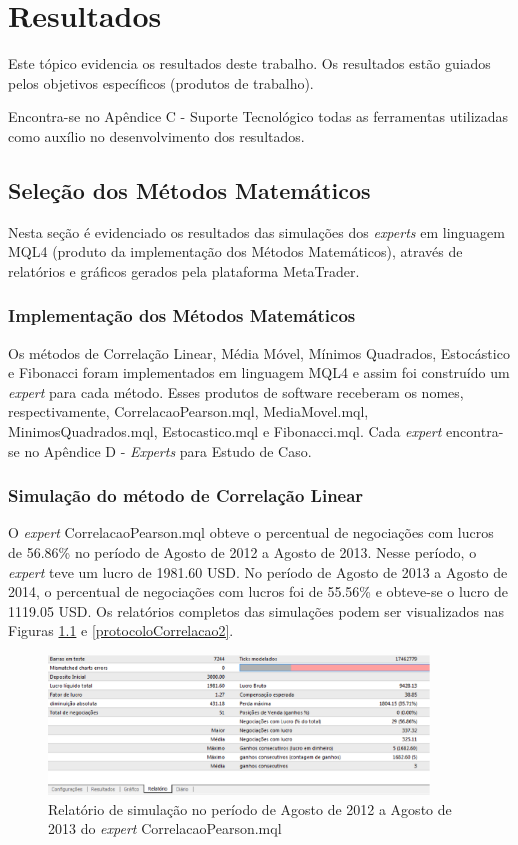 \chapter{Resultados}
Este tópico evidencia os resultados deste trabalho. Os resultados estão guiados pelos objetivos específicos (produtos de trabalho).

Encontra-se no Apêndice C - Suporte Tecnológico todas as ferramentas utilizadas como auxílio no desenvolvimento dos resultados.

\section{Seleção dos Métodos Matemáticos}

Nesta seção é evidenciado os resultados  das simulações dos \textit{experts} em linguagem MQL4 (produto da implementação dos Métodos Matemáticos), através de relatórios e gráficos gerados pela plataforma MetaTrader.

\subsection{Implementação dos Métodos Matemáticos}

Os métodos de Correlação Linear, Média Móvel, Mínimos Quadrados, Estocástico e Fibonacci foram implementados em linguagem MQL4 e assim foi construído um \textit{expert} para cada método. Esses produtos de software receberam os nomes, respectivamente, CorrelacaoPearson.mql, MediaMovel.mql, MinimosQuadrados.mql, Estocastico.mql e Fibonacci.mql. Cada \textit{expert} encontra-se no Apêndice D - \textit{Experts} para Estudo de Caso.

\subsection{Simulação do método de Correlação Linear}

O \textit{expert} CorrelacaoPearson.mql obteve o percentual de negociações com lucros de 56.86\% no período de Agosto de 2012 a Agosto de 2013. Nesse período, o \textit{expert} teve um lucro de 1981.60 USD. No período de Agosto de 2013 a Agosto de 2014, o percentual de negociações com lucros foi de 55.56\%  e obteve-se o lucro de 1119.05 USD. 
Os relatórios completos das simulações podem ser visualizados nas Figuras \ref{protocoloCorrelacao} e \ref{protocoloCorrelacao2}.

\begin{figure}[H]
\centering
\includegraphics[width=0.9\textwidth]{figuras/protocoloCorrelacao}
\caption{Relatório de simulação no período de Agosto de 2012 a Agosto de 2013 do \textit{expert} CorrelacaoPearson.mql}
\label{protocoloCorrelacao}
\end{figure}

